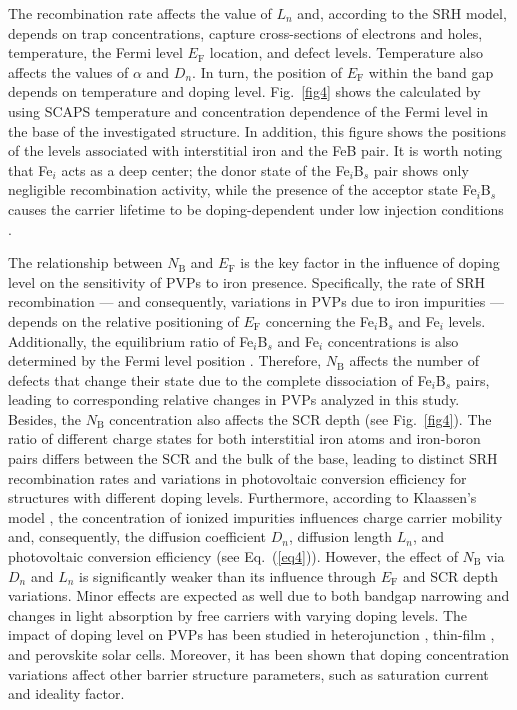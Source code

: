 \documentclass[a4paper,fleqn]{cas-sc}
\begin{document}
The recombination rate affects the value of $L_n$ and, according to the SRH model,
depends on trap concentrations, capture cross-sections of electrons and holes, temperature, the Fermi level $E_\mathrm{F}$ location, and defect levels.
Temperature also affects the values of $\alpha$ and $D_n$.
In turn, the position of $E_\mathrm{F}$ within the band gap depends on temperature and doping level.
Fig.~\ref{fig4} shows the calculated by using SCAPS temperature and concentration dependence of the Fermi level in the base of the investigated structure.
In addition, this figure shows the positions of the levels associated with interstitial iron and the FeB pair.
It is worth noting that Fe$_i$ acts as a deep center;
the donor state of the Fe$_i$B$_s$ pair shows only negligible recombination activity,
while the presence of the acceptor state Fe$_i$B$_s$ causes the
carrier lifetime to be doping-dependent under low injection conditions \cite{FeB:Schmidt}.


The relationship between $N_\mathrm{B}$ and $E_\mathrm{F}$ is the key  factor
in the influence of doping level on the sensitivity of PVPs to iron presence.
Specifically, the rate of SRH recombination ---
and consequently, variations in PVPs due to iron impurities ---
depends on the relative positioning of $E_\mathrm{F}$ concerning the Fe$_i$B$_s$ and Fe$_i$ levels.
Additionally, the equilibrium ratio of Fe$_i$B$_s$ and Fe$_i$ concentrations is also determined by the Fermi level position \cite{FeB:kinetic,MurphyJAP2011}.
Therefore, $N_\mathrm{B}$ affects the number of defects that change their state due to the complete dissociation of Fe$_i$B$_s$ pairs,
leading to corresponding relative changes in PVPs analyzed in this study.
Besides, the $N_\mathrm{B}$ concentration also affects the SCR depth (see Fig.~\ref{fig4}).
The ratio of different charge states for both interstitial iron atoms and iron-boron pairs differs between the SCR and the bulk of the base, leading to distinct SRH recombination rates and variations in photovoltaic conversion efficiency for structures with different doping levels.
Furthermore, according to Klaassen’s model \cite{KLAASSEN953},
the concentration of ionized impurities influences charge carrier mobility and, consequently, the diffusion coefficient $D_n$, diffusion length $L_n$,
and photovoltaic conversion efficiency (see Eq.~(\ref{eq4})).
However, the effect of $N_\mathrm{B}$ via $D_n$ and $L_n$ is significantly weaker than its influence through $E_\mathrm{F}$ and SCR depth variations.
Minor effects are expected as well due to both bandgap narrowing and changes in light absorption by free carriers with varying doping levels.
The impact of doping level on PVPs has been studied in heterojunction \cite{Sultana2024},
thin-film \cite{Akila2024},
and perovskite \cite{MasumMia2025} solar cells.
Moreover, it has been shown \cite{Akila2024} that
doping concentration variations affect other barrier structure parameters, such as saturation current and ideality factor.
\end{document}
